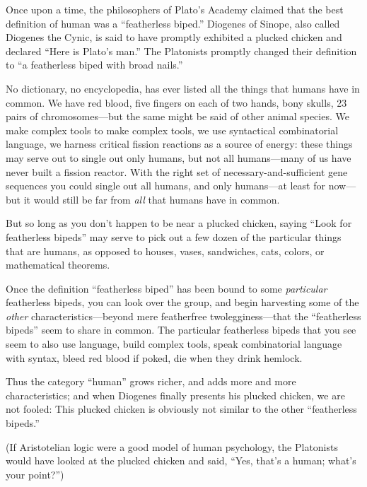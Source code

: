 \myendsectiontext


\bigskip


{
 Once upon a time, the philosophers of Plato's
Academy claimed that the best definition of human was a
``featherless biped.'' Diogenes of
Sinope, also called Diogenes the Cynic, is said to have promptly
exhibited a plucked chicken and declared ``Here is
Plato's man.'' The Platonists
promptly changed their definition to ``a featherless
biped with broad nails.'' }

{
 No dictionary, no encyclopedia, has ever listed all the things
that humans have in common. We have red blood, five fingers on each of
two hands, bony skulls, 23 pairs of chromosomes---but the same might be
said of other animal species. We make complex tools to make complex
tools, we use syntactical combinatorial language, we harness critical
fission reactions as a source of energy: these things may serve out to
single out only humans, but not all humans---many of us have never
built a fission reactor. With the right set of necessary-and-sufficient
gene sequences you could single out all humans, and only humans---at
least for now---but it would still be far from \textit{all} that humans
have in common.}

{
 But so long as you don't happen to be near a
plucked chicken, saying ``Look for featherless
bipeds'' may serve to pick out a few dozen of the
particular things that are humans, as opposed to houses, vases,
sandwiches, cats, colors, or mathematical theorems.}

{
 Once the definition ``featherless
biped'' has been bound to some \textit{particular}
featherless bipeds, you can look over the group, and begin harvesting
some of the \textit{other} characteristics---beyond mere featherfree
twolegginess---that the ``featherless
bipeds'' seem to share in common. The particular
featherless bipeds that you see seem to also use language, build
complex tools, speak combinatorial language with syntax, bleed red
blood if poked, die when they drink hemlock.}

{
 Thus the category ``human''
grows richer, and adds more and more characteristics; and when Diogenes
finally presents his plucked chicken, we are not fooled: This plucked
chicken is obviously not similar to the other
``featherless bipeds.''}

{
 (If Aristotelian logic were a good model of human psychology, the
Platonists would have looked at the plucked chicken and said,
``Yes, that's a human;
what's your point?'')}

